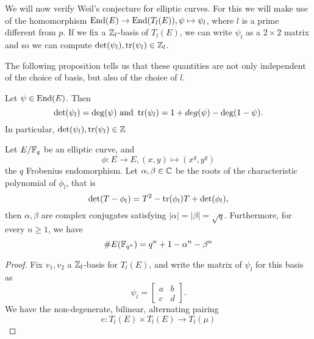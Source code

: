 We will now verify Weil's conjecture for elliptic curves. For this we will 
make use of the homomorphism $\operatorname{End}(E) \to \operatorname{End}(T_l(E)), \psi \mapsto \psi_l$,
where $l$ is a prime different from $p$. If we fix a $\mathbb{Z}_l$-basis
of $T_l(E)$, we can write $\psi_l$ as a $2\times 2$ matrix and so we can 
compute $\det(\psi_l), \operatorname{tr}(\psi_l) \in \mathbb{Z}_l$.

The following proposition tells us that these quantities are not only
independent of the choice of basis, but also of the choice of $l$.

\begin{proposition}
	Let $\psi \in \operatorname{End}(E)$. Then
	\begin{equation*}
		\det(\psi_l) = \deg(\psi)\textrm{ and }
		\operatorname{tr}(\psi_l) = 1 + deg(\psi) - \deg(1 - \psi).
	\end{equation*}
	In particular, $\det(\psi_l), \operatorname{tr}(\psi_l) \in \mathbb{Z}$
\end{proposition}

\begin{proposition}
	\label{prop:frob-char-poly}
	Let $E/\mathbb{F}_q$ be an elliptic curve, and
	\begin{equation*}
		\phi: E \to E, (x, y) \mapsto (x^q, y^q)
	\end{equation*}
	the $q$ Frobenius endomorphism.
	Let $\alpha, \beta \in \mathbb{C}$ be the roots of the characteristic polynomial
	of $\phi_l$, that is
	\begin{equation*}
		\det(T - \phi_l) = T^2 - \operatorname{tr}(\phi_l)T + \det(\phi_l),
	\end{equation*}
	then $\alpha, \beta$ are complex conjugates satisfying
	$|\alpha| = |\beta| = \sqrt{q}$. Furthermore, for every $n \geq 1$, we
	have
	\begin{equation*}
		\#E(\mathbb{F}_{q^n}) = q^n + 1 - \alpha^n - \beta^n
	\end{equation*}
\end{proposition}

\begin{proof}
	Fix $v_1, v_2$ a $\mathbb{Z}_l$-basis for
	$T_l(E)$, and write the matrix of $\psi_l$ for this basis as
	\begin{equation*}
		\psi_l = 
		\begin{bmatrix}
			a & b \\
			c & d
		\end{bmatrix}
		.
	\end{equation*}
	We have the non-degenerate, bilinear, alternating pairing
	\begin{equation*}
		e: T_l(E) \times T_l(E) \to T_l(\mu)
	\end{equation*}
\end{proof}

